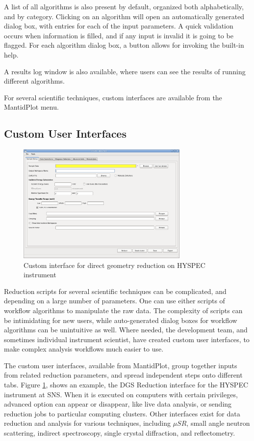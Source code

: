 \documentclass{elsarticle}
\begin{document}
A list of all algorithms is also present by default, organized both alphabetically, and by category. Clicking on an algorithm will open an automatically generated dialog box, with entries for each of the input parameters. A quick validation occurs when information is filled, and if any input is invalid it is going to be flagged. For each algorithm dialog box, a button allows for invoking the built-in help.

A results log window is also available, where users can see the results of running different algorithms.

For several scientific techniques, custom interfaces are available from the MantidPlot menu.



\subsection{Custom User Interfaces}
\begin{figure}[!ht]
\centerline{\includegraphics[width=0.75\textwidth]{Hyspec.png}}
\caption{Custom interface for direct geometry reduction on HYSPEC instrument}
\label{fig:Hyspec}
\end{figure}
Reduction scripts for several scientific techniques can be complicated, and depending on a large number of parameters. One can use either scripts of workflow algorithms to manipulate the raw data. The complexity of scripts can be intimidating for new users, while auto-generated dialog boxes for workflow algorithms can be unintuitive as well. Where needed, the development team, and sometimes individual instrument scientist, have created custom user interfaces, to make complex analysis workflows much easier to use.

The custom user interfaces, available from MantidPlot, group together inputs from related reduction parameters, and spread independent steps onto different tabs. Figure \ref{fig:Hyspec}, shows an example, the DGS Reduction interface for the HYSPEC instrument at SNS. When it is executed on computers with certain privileges, advanced option can appear or disappear, like live data analysis, or sending reduction jobs to particular computing clusters.
Other interfaces exist for data reduction and analysis for various techniques, including $\mu SR$\cite{musr}, small angle neutron scattering, indirect spectroscopy, single crystal diffraction, and reflectometry.
\end{document}
